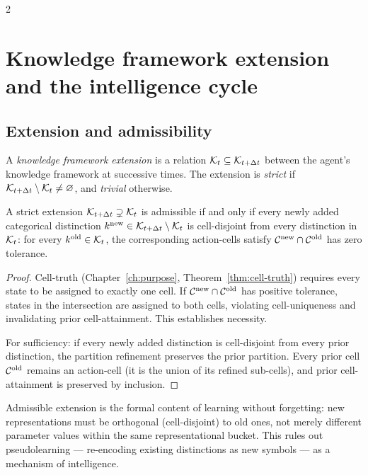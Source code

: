 \begin{multicols}{2}
\section{Knowledge framework extension and the intelligence cycle}
\label{sec:ch05-cycle}

\subsection{Extension and admissibility}

\begin{definition}\label{def:ch05-extension}
A \emph{knowledge framework extension} is a relation
$\mathcal{K}_t \subseteq \mathcal{K}_{t+\Delta t}$ between the agent's knowledge framework at
successive times. The extension is \emph{strict} if
$\mathcal{K}_{t+\Delta t} \setminus \mathcal{K}_t \neq \varnothing$, and \emph{trivial} otherwise.
\end{definition}

\begin{theorem}\label{thm:ch05-t1}
A strict extension $\mathcal{K}_{t+\Delta t} \supsetneq \mathcal{K}_t$ is admissible if and only if
every newly added categorical distinction
$k^{\mathrm{new}} \in \mathcal{K}_{t+\Delta t} \setminus \mathcal{K}_t$ is cell-disjoint from every
distinction in $\mathcal{K}_t$: for every $k^{\mathrm{old}} \in \mathcal{K}_t$, the corresponding
action-cells satisfy $\mathcal{C}^{\mathrm{new}} \cap \mathcal{C}^{\mathrm{old}}$ has zero tolerance.
\end{theorem}

\begin{proof}
Cell-truth (Chapter~\ref{ch:purpose}, Theorem~\ref{thm:cell-truth}) requires every state
to be assigned to exactly one cell. If $\mathcal{C}^{\mathrm{new}} \cap \mathcal{C}^{\mathrm{old}}$
has positive tolerance, states in the intersection are assigned to both cells, violating
cell-uniqueness and invalidating prior cell-attainment. This establishes necessity.

For sufficiency: if every newly added distinction is cell-disjoint from every prior
distinction, the partition refinement preserves the prior partition. Every prior cell
$\mathcal{C}^{\mathrm{old}}$ remains an action-cell (it is the union of its refined sub-cells),
and prior cell-attainment is preserved by inclusion.
\end{proof}

\begin{remark}
Admissible extension is the formal content of learning without forgetting: new
representations must be orthogonal (cell-disjoint) to old ones, not merely different
parameter values within the same representational bucket. This rules out pseudolearning
--- re-encoding existing distinctions as new symbols --- as a mechanism of intelligence.
\end{remark}


\end{multicols}
